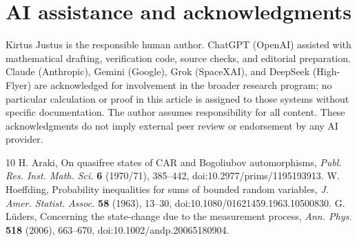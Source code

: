 \documentclass[11pt]{article}
\theoremstyle{definition}
\begin{document}
\section*{AI assistance and acknowledgments}
Kirtus Justus is the responsible human author. ChatGPT (OpenAI) assisted with mathematical drafting, verification code, source checks, and editorial preparation. Claude (Anthropic), Gemini (Google), Grok (SpaceXAI), and DeepSeek (High-Flyer) are acknowledged for involvement in the broader research program; no particular calculation or proof in this article is assigned to those systems without specific documentation. The author assumes responsibility for all content. These acknowledgments do not imply external peer review or endorsement by any AI provider.

\begin{thebibliography}{10}
 H. Araki, On quasifree states of CAR and Bogoliubov automorphisms, \emph{Publ. Res. Inst. Math. Sci.} \textbf{6} (1970/71), 385--442, doi:10.2977/prims/1195193913.
 W. Hoeffding, Probability inequalities for sums of bounded random variables, \emph{J. Amer. Statist. Assoc.} \textbf{58} (1963), 13--30, doi:10.1080/01621459.1963.10500830.
 G. L\"uders, Concerning the state-change due to the measurement process, \emph{Ann. Phys.} \textbf{518} (2006), 663--670, doi:10.1002/andp.20065180904.
\end{thebibliography}
\end{document}
